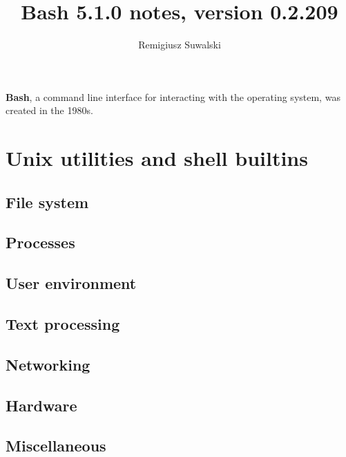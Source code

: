 \documentclass{charun}
\title{Bash 5.1.0 notes, version 0.2.209}
\author{Remigiusz Suwalski}
\begin{document}
\begin{multicols*}{3}
\maketitle
\raggedright

\textbf{Bash}, a command line interface for interacting with the operating system, was created in the 1980s.











\newpage
\section{Unix utilities and shell builtins}
\subsection{File system}


\subsection{Processes}


\subsection{User environment}


\subsection{Text processing}


\subsection{Networking}


\subsection{Hardware}


\subsection{Miscellaneous}


\end{multicols*}
\end{document}
